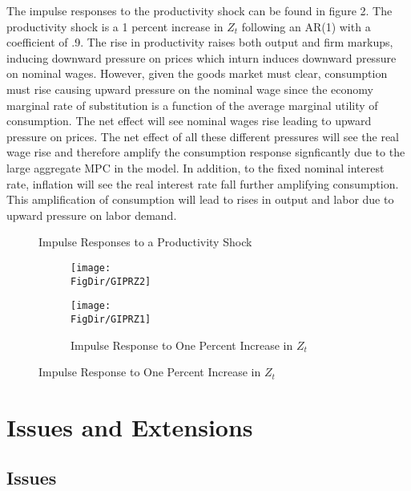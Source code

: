 \documentclass[titlepage]{\econtex}\providecommand{\texname}{BufferStockTheory}
\providecommand{\FigDir}{Figures}
\begin{document}
The impulse responses to the productivity shock can be found in figure 2. The productivity shock is a 1 percent increase in $Z_{t}$ following an AR(1) with a coefficient of .9. The rise in productivity raises both output and firm markups, inducing downward pressure on prices which inturn induces downward pressure on nominal wages. However, given the goods market must clear, consumption must rise causing upward pressure on the nominal wage since the economy marginal rate of substitution is a function of the average marginal utility of consumption. The net effect will see nominal wages rise leading to upward pressure on prices. The net effect of all these different pressures will see the real wage rise and therefore amplify the consumption response signficantly due to the large aggregate MPC in the model. In addition, to the fixed nominal interest rate, inflation will see the real interest rate fall further amplifying consumption. This amplification of consumption will lead to rises in output and labor due to upward pressure on labor demand.

\begin{figure}{Impulse Responses to a Productivity Shock}
  \begin{subfigure}{}
    \centering\texttt{[image: \\FigDir/GIPRZ2]}
  \end{subfigure}
  \begin{subfigure}{}
    \centering\texttt{[image: \\FigDir/GIPRZ1]}
    \caption{ Impulse Response to One Percent Increase in $Z_{t}$}
  \end{subfigure}
\end{figure}



\hypertarget{Issues and Extensions}{}
\section{Issues and Extensions}

\hypertarget{Issues }{}
\subsection{Issues }
\end{document}
